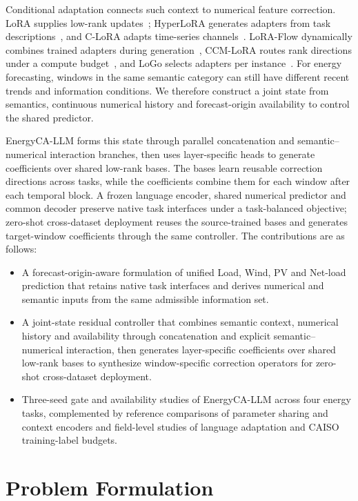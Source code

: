\documentclass[journal]{IEEEtran}
\begin{document}
Conditional adaptation connects such context to numerical feature correction. LoRA supplies low-rank updates~\cite{hu2022lora}; HyperLoRA generates adapters from task descriptions~\cite{lv2024hyperlora}, and C-LoRA adapts time-series channels~\cite{nie2024clora}. LoRA-Flow dynamically combines trained adapters during generation~\cite{wang2024loraflow}, CCM-LoRA routes rank directions under a compute budget~\cite{rafiuddin2026ccmlora}, and LoGo selects adapters per instance~\cite{lee2026logo}. For energy forecasting, windows in the same semantic category can still have different recent trends and information conditions. We therefore construct a joint state from semantics, continuous numerical history and forecast-origin availability to control the shared predictor.

EnergyCA-LLM forms this state through parallel concatenation and semantic--numerical interaction branches, then uses layer-specific heads to generate coefficients over shared low-rank bases. The bases learn reusable correction directions across tasks, while the coefficients combine them for each window after each temporal block. A frozen language encoder, shared numerical predictor and common decoder preserve native task interfaces under a task-balanced objective; zero-shot cross-dataset deployment reuses the source-trained bases and generates target-window coefficients through the same controller. The contributions are as follows:
\begin{itemize}
\item A forecast-origin-aware formulation of unified Load, Wind, PV and Net-load prediction that retains native task interfaces and derives numerical and semantic inputs from the same admissible information set.
\item A joint-state residual controller that combines semantic context, numerical history and availability through concatenation and explicit semantic--numerical interaction, then generates layer-specific coefficients over shared low-rank bases to synthesize window-specific correction operators for zero-shot cross-dataset deployment.
\item Three-seed gate and availability studies of EnergyCA-LLM across four energy tasks, complemented by reference comparisons of parameter sharing and context encoders and field-level studies of language adaptation and CAISO training-label budgets.
\end{itemize}

\section{Problem Formulation}
\label{sec:problem}
\end{document}
